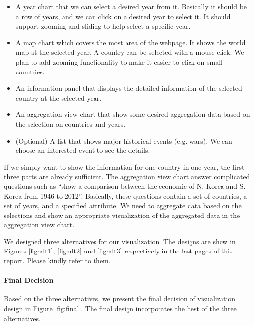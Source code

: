 \documentclass[12pt, fullpage,letterpaper]{article}
\begin{document}
\begin{itemize}
    \item A year chart that we can select a desired year from it.
        Basically it should be a row of years, and we can click on a desired year to select it.
        It should support zooming and sliding to help select a specific year.
    \item A map chart which covers the most area of the webpage.
        It shows the world map at the selected year.
        A country can be selected with a mouse click.
        We plan to add zooming functionality to make it easier to click on small countries.
    \item An information panel that displays the detailed information of the selected country at the selected year.
    \item An aggregation view chart that show some desired aggregation data based on the selection on countries and years.
    \item (Optional) A list that shows major historical events (e.g. wars). We can choose an interested event to see the details.
\end{itemize}

If we simply want to show the information for one country in one year, the
first three parts are already sufficient. The aggregation view chart answer
complicated questions such
as ``show a comparison between the economic of N. Korea and S. Korea from 1946
to 2012''.  Basically, these questions contain a set of countries, a set of
years, and a specified attribute.  We need to aggregate data based on the
selections and show an appropriate visualization of the aggregated data in the
aggregation view chart.

We designed three alternatives for our visualization.  The designs are show in
Figures \ref{fig:alt1}, \ref{fig:alt2} and \ref{fig:alt3} respectively in the
last pages of this report.  Please kindly refer to them.

\paragraph{Final Decision}

Based on the three alternatives, we present the final decision of visualization
design in Figure \ref{fig:final}. The final design incorporates the best
of the three alternatives.
\end{document}
